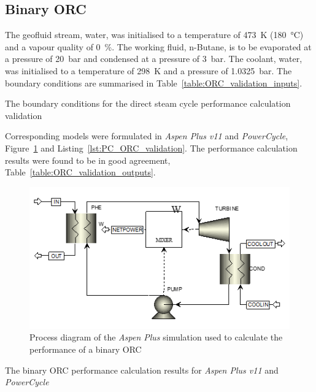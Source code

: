     \subsection{Binary ORC}
        The geofluid stream, water, was initialised to a temperature of \qty{473}{\K} (\qty{180}{\degreeCelsius}) and a vapour quality of \qty{0}{\percent}. The working fluid, n-Butane, is to be evaporated at a pressure of \qty{20}{\bar} and condensed at a pressure of \qty{3}{\bar}. The coolant, water, was initialised to a temperature of \qty{298}{\K} and a pressure of \qty{1.0325}{\bar}. The boundary conditions are summarised in Table~\ref{table:ORC_validation_inputs}.

        \begin{table}[H]
            \caption{The boundary conditions for the direct steam cycle performance calculation validation}
            \centering 
            \label{table:ORC_validation_inputs}
            
        \end{table}

        Corresponding models were formulated in \emph{Aspen Plus v11} and \emph{PowerCycle}, Figure~\ref{fig:Aspen_ORC_validation} and Listing~\ref{lst:PC_ORC_validation}. The performance calculation results were found to be in good agreement, Table~\ref{table:ORC_validation_outputs}.

        \begin{figure}[H]
            \centering
            \includegraphics{Content/PowerCycle/Figures/AspenPLus_ORCValidation.png}
            \caption{Process diagram of the \emph{Aspen Plus} simulation used to calculate the performance of a binary ORC}
            \label{fig:Aspen_ORC_validation}
        \end{figure}

        \begin{table}[H]
            \caption{The binary \ac{ORC} performance calculation results for \emph{Aspen Plus v11} and \emph{PowerCycle}}
            \centering 
            \label{table:ORC_validation_outputs}
            
        \end{table}

